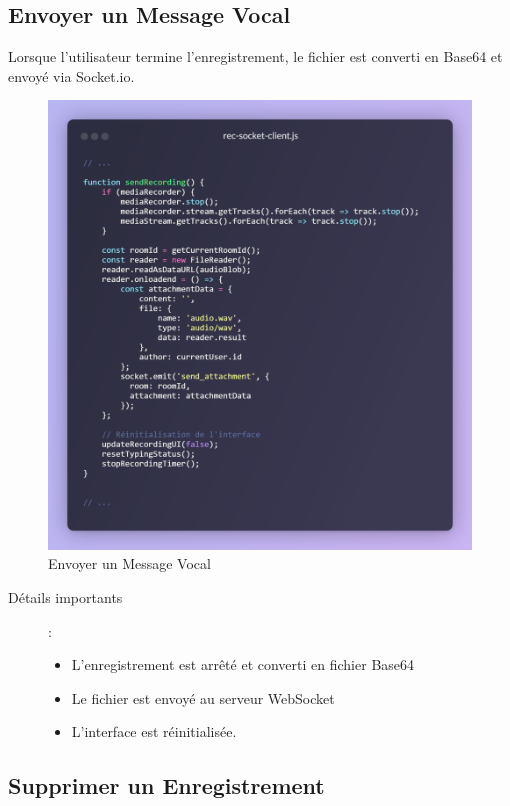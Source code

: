 \subsection*{Envoyer un Message Vocal}

Lorsque l'utilisateur termine l’enregistrement, le fichier est converti en Base64 et envoyé via Socket.io.

\begin{figure}[H]
    \centering
    \includegraphics[width=15cm]{assets/annexes/snippet (30).png}
    \caption{ Envoyer un Message Vocal}
\end{figure}

\begin{description}
    \item[Détails importants] :
    \begin{itemize}
        \item L’enregistrement est arrêté et converti en fichier Base64
        \item Le fichier est envoyé au serveur WebSocket
        \item L’interface est réinitialisée.
    \end{itemize}
\end{description}


\subsection*{Supprimer un Enregistrement}

